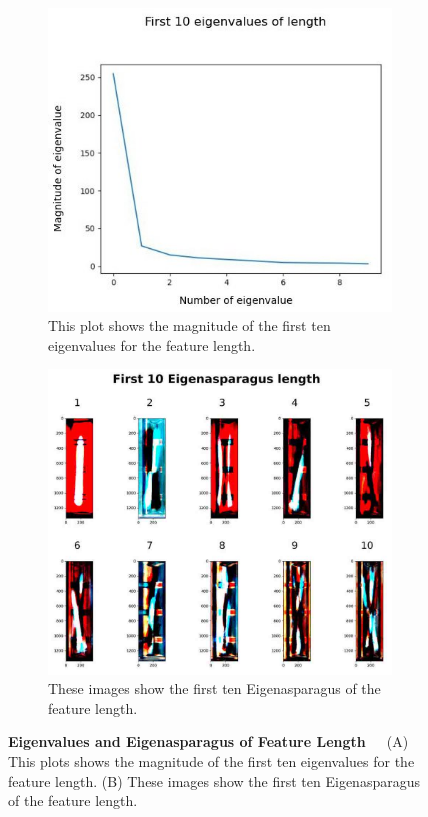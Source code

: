 \begin{figure}[!h]
	\centering
	\begin{subfigure}{0.7\textwidth}
		\includegraphics[width=0.9\linewidth]{Figures/chapter04/pca_length_graph.png} 
		\caption{This plot shows the magnitude of the first ten eigenvalues for the feature length.}
	\end{subfigure}
	\vspace{20pt}
	
	\begin{subfigure}{0.9\textwidth}
		\includegraphics[width=0.9\linewidth]{Figures/chapter04/pca_length.png}
		\caption{These images show the first ten Eigenasparagus of the feature length.}
	\end{subfigure}
	\caption[First Ten Eigenvalues and Eigenasparagus of Feature Length]{\textbf{Eigenvalues and Eigenasparagus of Feature Length}~~~(A) This plots shows the magnitude of the first ten eigenvalues for the feature length. (B) These images show the first ten Eigenasparagus of the feature length.}
    \label{fig:PCAlength}
\end{figure}

